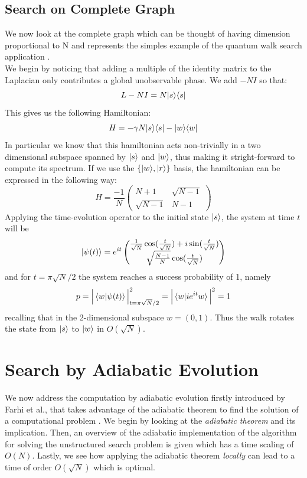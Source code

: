 \subsection{Search on Complete Graph}
We now look at the complete graph which can be thought of having dimension proportional to N and represents the simples example of the quantum walk search application \cite{Childs2004}. \\We begin by noticing that adding a multiple of the identity matrix to the Laplacian only contributes a global unobservable phase. We add $-NI$ so that:
\begin{equation}
  L - NI = N{|{s}\rangle}{\langle{s}|}
\end{equation}
This gives us the following Hamiltonian:
\begin{equation}
  H = -\gamma N {|{s}\rangle}{\langle{s}|} - {|{w}\rangle}{\langle{w}|}
\end{equation}
In particular we know that this hamiltonian acts non-trivially in a two dimensional subspace spanned by ${|{s}\rangle}$ and ${|{w}\rangle}$, thus making it stright-forward to compute its spectrum. If we use the $\{{|{w}\rangle}, {|{r}\rangle}\}$ basis, the hamiltonian can be expressed in the following way:
\begin{equation}
  H = \frac{-1}{N} \begin{pmatrix} N+1 & \sqrt{N-1}\\ \sqrt{N-1} & N-1 \end{pmatrix}
\end{equation}
Applying the time-evolution operator to the initial state ${|{s}\rangle}$, the system at time $t$ will be
\begin{equation}
  {|{\psi(t)}\rangle} = e^{it}
  \begin{pmatrix}
  \frac{1}{\sqrt{N}}\cos(\frac{t}{\sqrt{N}}) +i\sin(\frac{t}{\sqrt{N}})\\
  \sqrt{\frac{N-1}{N}}\cos(\frac{t}{\sqrt{N}})
  \end{pmatrix}
\end{equation}
and for $t=\pi\sqrt{N}/2$ the system reaches a success probability of 1, namely
\begin{equation}
  p = \Big|\braket{w|\psi(t)}\Big|^2_{t=\pi\sqrt{N}/2} = \Big|\braket{w |  ie^{it}w}\Big|^2 = 1
\end{equation}
recalling that in the 2-dimensional subspace $w = (0,1)$. Thus the walk rotates the state from ${|{s}\rangle}$ to ${|{w}\rangle}$ in $O(\sqrt{N})$.

\section{Search by Adiabatic Evolution}
We now address the computation by adiabatic evolution firstly introduced by Farhi et al., that takes advantage of the adiabatic theorem to find the solution of a computational problem \cite{Farhi2000}. We begin by looking at the \textit{adiabatic theorem} and its implication. Then, an overview of the adiabatic implementation of the algorithm for solving the unstructured search problem is given which has a time scaling of $O(N)$. Lastly, we see how applying the adiabatic theorem \textit{locally} can lead to a time of order $O(\sqrt{N})$ which is optimal.

